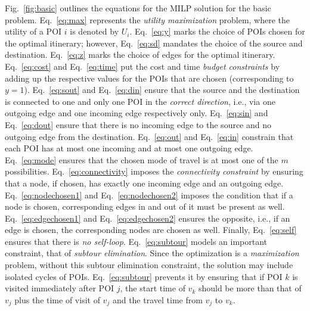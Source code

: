 Fig.~\ref{fig:basic} outlines the equations for the
MILP solution for the basic \trip problem.  Eq.~\eqref{eq:max}
represents the \emph{utility maximization} problem, where the
utility of a POI $i$ is denoted by $U_i$.  Eq.~\eqref{eq:y} marks
the choice of POIs chosen for the optimal itinerary; however,
Eq.~\eqref{eq:sd} mandates the choice of the source and destination.
Eq.~\eqref{eq:z} marks the choice of edges for the optimal
itinerary.  Eq.~\eqref{eq:cost} and Eq.~\eqref{eq:time} put the
cost and time \emph{budget constraints} by adding up the
respective values for the POIs that are chosen (corresponding to
$y = 1$).  Eq.~\eqref{eq:sout} and Eq.~\eqref{eq:din} ensure that
the source and the destination is connected to one and only one
POI in the \emph{correct direction}, i.e., via one outgoing edge
and one incoming edge respectively only.  Eq.~\eqref{eq:sin} and
Eq.~\eqref{eq:dout} ensure that there is no incoming edge to the
source and no outgoing edge from the destination.
Eq.~\eqref{eq:out} and Eq.~\eqref{eq:in} constrain that each POI
has at most one incoming and at most one outgoing edge.
Eq.~\eqref{eq:mode} ensures that the chosen mode of travel is at
most one of the $m$ possibilities.  Eq.~\eqref{eq:connectivity}
imposes the \emph{connectivity constraint} by ensuring that a
node, if chosen, has exactly one incoming edge and an outgoing
edge.  Eq.~\eqref{eq:nodechosen1} and Eq.~\eqref{eq:nodechosen2}
imposes the condition that if a node is chosen, corresponding
edges in and out of it must be present as well.
Eq.~\eqref{eq:edgechosen1} and Eq.~\eqref{eq:edgechosen2} ensures
the opposite, i.e., if an edge is chosen, the corresponding nodes
are chosen as well.  Finally, Eq.~\eqref{eq:self} ensures that
there is \emph{no self-loop}.
Eq.~\eqref{eq:subtour} models an important constraint, that of \emph{subtour
elimination}.
Since the optimization is a \emph{maximization} problem, without this subtour
elimination constraint, the solution may include isolated cycles of POIs.
Eq.~\eqref{eq:subtour} prevents it by ensuring that if POI $k$ is visited
immediately after POI $j$, the start time of $v_k$ should be more than that of
$v_j$ plus the time of visit of $v_j$ and the travel time from $v_j$ to $v_k$.

